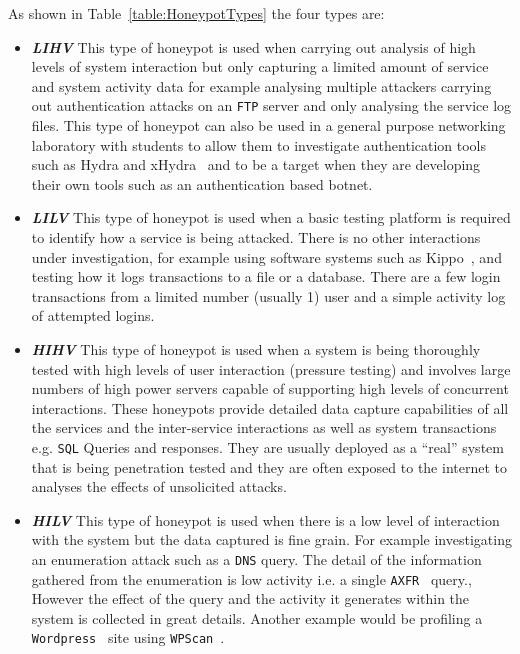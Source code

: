 As shown in Table~\ref{table:HoneypotTypes} the four types are:
\begin{itemize}
\item \noindent \emph{\textbf{LIHV}} This type of honeypot is used when carrying out analysis of high levels of system interaction but only capturing a limited amount of service and system activity data for example analysing multiple attackers carrying out authentication attacks on an \texttt{FTP} server and only analysing the service log files. This type of honeypot can also be used in a general purpose networking laboratory with students to allow them to investigate authentication tools such as Hydra and xHydra~\cite{RS:15} and to be a target when they are developing their own tools such as an authentication based botnet. 

\item \noindent \emph{\textbf{LILV}} This type of honeypot is used when a basic testing platform is required to identify how a service is being attacked. There is no other interactions under investigation, for example using software systems such as Kippo~\cite{D:16,SH:15}, and testing how it logs transactions to a file or a database. There are a few login transactions from a limited number (usually 1) user and a simple activity log of attempted logins.

\item \noindent \emph{\textbf{HIHV}} This type of honeypot is used when a system is being thoroughly tested with high levels of user interaction (pressure testing) and involves large numbers of high power servers capable of supporting high levels of concurrent interactions. These honeypots provide detailed data capture capabilities of all the services and the inter-service interactions as well as system transactions e.g. \texttt{SQL} Queries and responses. They are usually deployed as a ``real'' system that is being penetration tested and they are often exposed to the internet to analyses the effects of unsolicited attacks.  

\item \noindent \emph{\textbf{HILV}} This type of honeypot is used when there is a low level of interaction with the system but the data captured is fine grain. For example investigating an enumeration attack such as a \texttt{DNS} query. The detail of the information gathered from the enumeration is low activity i.e. a single \texttt{AXFR}~\cite{EL:10} query., However the effect of the query and the activity it generates within the system is collected in great details. Another example would be profiling a \texttt{Wordpress}~\cite{WP:17} site using \texttt{WPScan}~\cite{WT:17}.

\end{itemize}

